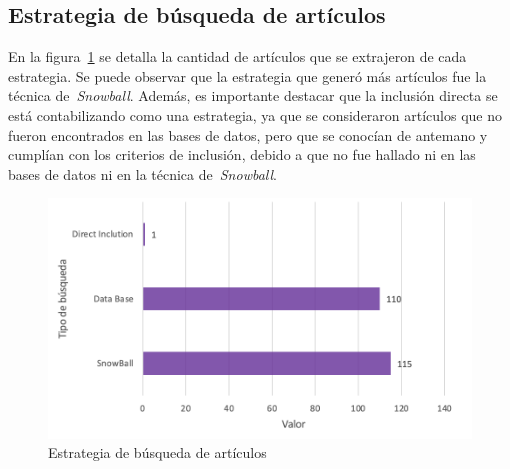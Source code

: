 \subsection{Estrategia de búsqueda de artículos}
En la figura~\ref{fig:estrategia-busqueda-articulos} se detalla la cantidad de artículos que se extrajeron de cada estrategia. Se puede observar que la estrategia que generó más artículos fue la técnica de~\textit{Snowball}. Además, es importante destacar que la inclusión directa se está contabilizando como una estrategia, ya que se consideraron artículos que no fueron encontrados en las bases de datos, pero que se conocían de antemano y cumplían con los criterios de inclusión, debido a que no fue hallado ni en las bases de datos ni en la técnica de~\textit{Snowball}.
\begin{figure}[H]
    \centering
    \includegraphics[scale=0.8]{tablas-images/cp2/estrategia-busqueda-articulos.png}
    \caption{Estrategia de búsqueda de artículos}\label{fig:estrategia-busqueda-articulos}
\end{figure}
\noindent
